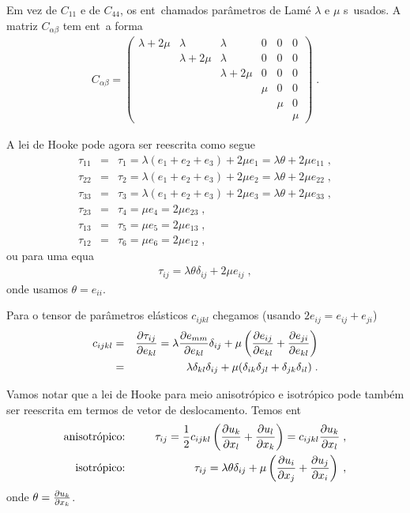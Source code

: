 Em vez de $C_{11}$ e de $C_{44}$, os ent\ao\ chamados
par\^ametros de Lam\'e $\lambda$ e $\mu$ s\ao\ usados.
A matriz $C_{\alpha \beta}$ tem ent\ao\ a forma
\begin{eqnarray}
C_{\alpha \beta} = \left(
\begin{array}{cccccc}
\lambda+2\mu & \lambda  & \lambda & 0 & 0 & 0 \\
     & \lambda+2\mu & \lambda & 0  & 0 & 0 \\
     &       & \lambda+2\mu & 0 & 0 & 0 \\
     &       &        & \mu & 0 & 0 \\
     &       &        &     & \mu & 0 \\
     &       &        &     &     & \mu
\end{array} \right) \; .
\end{eqnarray}

A lei de Hooke pode agora ser reescrita como segue
\begin{eqnarray*}
\tau_{11} &=& \tau_1 = \lambda(e_1 + e_2 + e_3)+2\mu e_1=
\lambda \theta + 2 \mu e_{11} \; , \\
\tau_{22} &=& \tau_2 = \lambda(e_1 + e_2 + e_3)+2\mu e_2=
\lambda \theta + 2 \mu e_{22} \; , \\
\tau_{33} &=& \tau_3 = \lambda(e_1 + e_2 + e_3)+2\mu e_3=
\lambda \theta + 2 \mu e_{33} \; , \\
\tau_{23} &=& \tau_4 = \mu e_4 = 2 \mu e_{23} \; , \\
\tau_{13} &=& \tau_5 = \mu e_5 = 2 \mu e_{13} \; , \\
\tau_{12} &=& \tau_6 = \mu e_6 = 2 \mu e_{12} \; ,
\end{eqnarray*}
ou para uma equa\cao
\begin{eqnarray}
\tau_{ij} = \lambda \theta \delta_{ij} + 2 \mu e_{ij} \; ,
\end{eqnarray}
onde usamos $\theta = e_{ii}$.

Para o tensor de par\^ametros el\'asticos $c_{ijkl}$
chegamos (usando $2e_{ij} = e_{ij} + e_{ji}$)
\begin{eqnarray} \label{tpelas}
c_{ijkl} &=& \frac{\partial \tau_{ij}}{\partial e_{kl}} = \lambda
\frac{\partial e_{mm}}{\partial e_{kl}} \delta_{ij} + \mu \left(
\frac{\partial e_{ij}}{\partial e_{kl}} + \frac{\partial e_{ji}}{\partial e_{kl}}
\right) \nonumber \\
&=& \lambda \delta_{kl} \delta_{ij} + \mu (\delta_{ik}
\delta_{jl} + \delta_{jk} \delta_{il}) \; .
\end{eqnarray}

Vamos notar que a lei de Hooke para meio anisotr\'opico
e isotr\'opico pode tamb\'em ser reescrita em termos de
vetor de deslocamento. Temos ent\ao
\begin{eqnarray}
\mbox{anisotr\'opico:} &\hspace{0.6cm}& \tau_{ij}=\frac{1}{2}
c_{ijkl} \left( \frac{\partial u_k}{\partial x_l} + \frac{\partial u_l}{\partial x_k}\right)
= c_{ijkl}\frac{\partial u_k}{\partial x_l} \; , \label{lhanis} \\
\mbox{isotr\'opico:} &\hspace{0.6cm}& \tau_{ij} = 
\lambda \theta \delta_{ij} + \mu \left( \frac{\partial u_i}{\partial x_j} +
\frac{\partial u_j}{\partial x_i} \right) \; , \label{lhiso}
\end{eqnarray} 
onde $\theta = \frac{\partial u_k}{\partial x_k}$.

